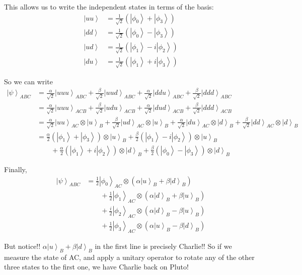 \documentclass[12pt]{article}
\newcommand{\ket}[1]{\left\vert #1 \right\rangle}
\begin{document}
        This allows us to write the independent states in terms of the basis:
        \begin{align*}
            \ket{uu} &= \frac{1}{\sqrt 2}(\ket{\phi_0} + \ket{\phi_3})\\
            \ket{dd} &= \frac{1}{\sqrt 2}(\ket{\phi_0} - \ket{\phi_3})\\
            \ket{ud} &= \frac{1}{\sqrt 2}(\ket{\phi_1} - i\ket{\phi_2})\\
            \ket{du} &= \frac{1}{\sqrt 2}(\ket{\phi_1} + i\ket{\phi_3})
        \end{align*}

        So we can write 
        \begin{align*}
            \ket{\psi}_{ABC} &= \frac{\alpha}{\sqrt 2}\ket{uuu}_{ABC} + \frac{\beta}{\sqrt 2}\ket{uud}_{ABC} + \frac{\alpha}{\sqrt 2}\ket{ddu}_{ABC} + \frac{\beta}{\sqrt 2}\ket{ddd}_{ABC}\\
            &= \frac{\alpha}{\sqrt 2}\ket{uuu}_{ACB} + \frac{\beta}{\sqrt 2}\ket{udu}_{ACB} + \frac{\alpha}{\sqrt 2}\ket{dud}_{ACB} + \frac{\beta}{\sqrt 2}\ket{ddd}_{ACB}\\
            &= \frac{\alpha}{\sqrt 2}\ket{uu}_{AC}\otimes \ket{u}_B + \frac{\beta}{\sqrt 2}\ket{ud}_{AC}\otimes \ket{u}_B + \frac{\alpha}{\sqrt 2}\ket{du}_{AC}\otimes \ket{d}_B + \frac{\beta}{\sqrt 2}\ket{dd}_{AC}\otimes \ket{d}_B\\
            &= \frac{\alpha}{2}(\ket{\phi_1} + \ket{\phi_3})\otimes \ket{u}_B + \frac{\beta}{2}(\ket{\phi_1} - i\ket{\phi_2})\otimes \ket{u}_B\\
            &\qquad + \frac{\alpha}{2}(\ket{\phi_1} + i\ket{\phi_2})\otimes \ket{d}_B + \frac{\beta}{2}(\ket{\phi_0} - \ket{\phi_3})\otimes \ket{d}_B
        \end{align*}

        Finally, 
        \begin{align*}
            \ket{\psi}_{ABC} &= \frac{1}{2}\ket{\phi_0}_{AC}\otimes (\alpha\ket{u}_B + \beta\ket{d}_B)\\
            &\qquad + \frac{1}{2}\ket{\phi_1}_{AC}\otimes (\alpha\ket{d}_B + \beta\ket{u}_B)\\
            &\qquad + \frac{i}{2}\ket{\phi_2}_{AC}\otimes (\alpha\ket{d}_B - \beta\ket{u}_B)\\
            &\qquad + \frac{1}{2}\ket{\phi_3}_{AC} \otimes (\alpha\ket{u}_B - \beta\ket{d}_B)
        \end{align*}

        But notice!! $\alpha\ket{u}_B + \beta\ket{d}_B$ in the first line is precisely Charlie!! So if we measure the state of AC, and apply a unitary operator to rotate any of the other three states to the first one, we have Charlie back on Pluto!
\end{document}
